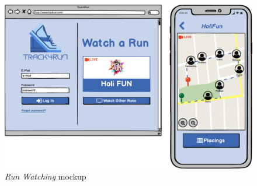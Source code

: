 \begin{figure}
\begin{center}
  \includegraphics[width=\textwidth]{img/mockup/VisitRun.png}
  \hspace{0.05\linewidth}
  \centering
  \caption{\textit{Run Watching} mockup}
  \label{img:runWatchingMockup}
\end{center}
\end{figure}
